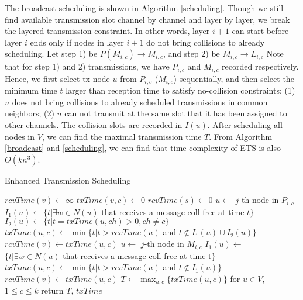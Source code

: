 \documentclass[10pt, conference]{IEEEtran}
\begin{document}
The broadcast scheduling is shown in Algorithm
\ref{scheduling}. Though we still find available transmission
slot channel by channel and layer by layer, we break the
layered transmission constraint. In other words, layer $i+1$
can start before layer $i$ ends only if nodes in layer $i+1$ do
not bring collisions to already scheduling. Let step 1) be
$P(M_{i,c}) \rightarrow M_{i,c}$, and step 2) be $M_{i,c}
\rightarrow L_{i,c}$ Note that for step 1) and 2)
transmissions, we have $P_{i,c}$ and $M_{i,c}$ recorded
respectively. Hence, we first select tx node $u$ from $P_{i,c}$
($M_{i,c}$) sequentially, and then select the minimum time $t$
larger than reception time to satisfy no-collision constraints:
(1) $u$ does not bring collisions to already scheduled
transmissions in common neighbors; (2) $u$ can not transmit at
the same slot that it has been assigned to other channels. The
collision slots are recorded in $I(u)$. After scheduling all
nodes in $V$, we can find the maximal transmission time $T$.
From Algorithm \ref{broadcast} and \ref{scheduling}, we can
find that time complexity of ETS is also $O(k n^3)$.


\begin{algorithm}[tbp]
\caption{Enhanced Transmission Scheduling}
\label{scheduling}
{
    $rcvTime(v) \leftarrow \infty$\;
    {
        $txTime(v,c) \leftarrow 0$\;
    }
}
$rcvTime(s) \leftarrow 0$\;
{
 {
    {
        $u \leftarrow$ $j$-th node in $P_{i,c}$\;
        $I_1(u) \leftarrow \{t | \exists w \in N(u)$ that receives a message coll-free at time
$t\}$\;
        $I_2(u) \leftarrow \{t | t = txTime(u, ch) > 0, ch \neq
c\}$\;
$txTime(u, c) \leftarrow \min\{t | t > rcvTime(u)$ and $t \not\in
I_1(u) \cup I_2(u)\}$\;
        {
            $rcvTime(v) \leftarrow txTime(u, c)$\;
        }
    }
    {
        $u \leftarrow$ $j$-th node in $M_{i,c}$\;
        $I_1(u) \leftarrow$ $\{t|\exists w \in N(u)$ that receives a message coll-free at time
t$\}$\;
        $txTime(u, c) \leftarrow \min\{t | t > rcvTime(u)$ and $t \not\in
I_1(u)\}$\;
        {
            $rcvTime(v) \leftarrow txTime(u, c)$\;
        }
    }
 }
}
$T \leftarrow \max_{u,c} \{txTime(u,c)\}$ for $u \in
V$, $1 \leq c \leq k$\;
return $T$, $txTime$\;
\end{algorithm}
\end{document}
